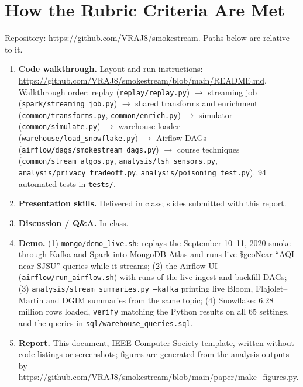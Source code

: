\section{How the Rubric Criteria Are Met}
\newcommand{\repo}[1]{\url{https://github.com/VRAJ8/smokestream/blob/main/#1}}
Repository: \url{https://github.com/VRAJ8/smokestream}. Paths below are relative to it.

\begin{enumerate}
\item \textbf{Code walkthrough.} Layout and run instructions: \repo{README.md}. Walkthrough order: replay (\texttt{replay/replay.py}) $\rightarrow$ streaming job (\texttt{spark/streaming\_job.py}) $\rightarrow$ shared transforms and enrichment (\texttt{common/transforms.py}, \texttt{common/enrich.py}) $\rightarrow$ simulator (\texttt{common/simulate.py}) $\rightarrow$ warehouse loader (\texttt{warehouse/load\_snowflake.py}) $\rightarrow$ Airflow DAGs (\texttt{airflow/dags/smokestream\_dags.py}) $\rightarrow$ course techniques (\texttt{common/stream\_algos.py}, \texttt{analysis/lsh\_sensors.py}, \texttt{analysis/privacy\_tradeoff.py}, \texttt{analysis/poisoning\_test.py}). 94 automated tests in \texttt{tests/}.

\item \textbf{Presentation skills.} Delivered in class; slides submitted with this report.

\item \textbf{Discussion / Q\&A.} In class.

\item \textbf{Demo.} (1) \texttt{mongo/demo\_live.sh}: replays the September 10--11, 2020 smoke through Kafka and Spark into MongoDB Atlas and runs live \$geoNear ``AQI near SJSU'' queries while it streams; (2) the Airflow UI (\texttt{airflow/run\_airflow.sh}) with runs of the live ingest and backfill DAGs; (3) \texttt{analysis/stream\_summaries.py --kafka} printing live Bloom, Flajolet--Martin and DGIM summaries from the same topic; (4) Snowflake: 6.28 million rows loaded, \texttt{verify} matching the Python results on all 65 settings, and the queries in \texttt{sql/warehouse\_queries.sql}.

\item \textbf{Report.} This document, IEEE Computer Society template, written without code listings or screenshots; figures are generated from the analysis outputs by \repo{paper/make\_figures.py}.


\end{enumerate}
